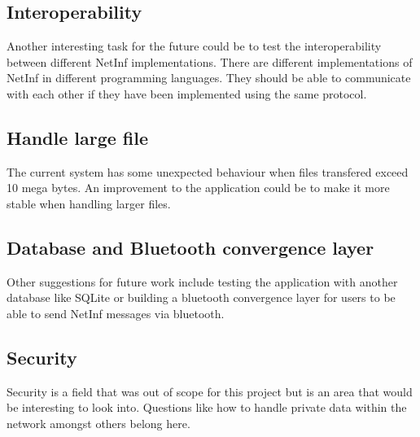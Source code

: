 \subsection{Interoperability}

Another interesting task for the future could be to test the interoperability between different NetInf implementations. There are different implementations of NetInf in different programming languages. They should be able to communicate with each other if they have been implemented using the same protocol. 

\subsection{Handle large file}

The current system has some unexpected behaviour when files transfered exceed 10 mega bytes. An improvement to the application could be to make it more stable when handling larger files.

\subsection{Database and Bluetooth convergence layer}

Other suggestions for future work include testing the application with another database like SQLite or building a bluetooth convergence layer for users to be able to send NetInf messages via bluetooth. 

\subsection{Security}

Security is a field that was out of scope for this project but is an area that would be interesting to look into. Questions like how to handle private data within the network amongst others belong here.

